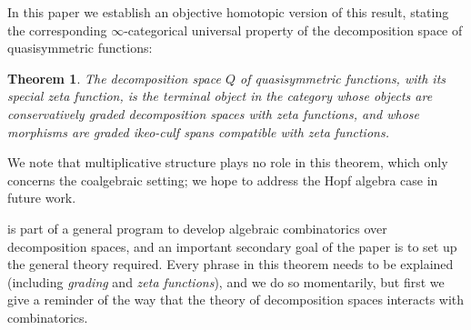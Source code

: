 \documentclass{amsart}
\newtheorem{letterthm}{Theorem}\renewcommand{\theletterthm}{\Alph{letterthm}}
\theoremstyle{definition}
\theoremstyle{noname}
\begin{document}
In this paper we establish an objective homotopic version of this result, 
stating the corresponding $\infty$-categorical  universal property of the decomposition space
of quasi\-symmetric functions:
\begin{letterthm}\label{intro theorem A}
The decomposition space $Q$ of quasisymmetric functions, with its special
zeta function, is the terminal object in the category whose objects are
conservatively graded decomposition spaces with zeta functions, and whose
morphisms are graded ikeo-culf spans compatible with zeta functions.
\end{letterthm}
We note
that multiplicative structure plays no role in this theorem, which only concerns the
coalgebraic setting; we hope to address the Hopf algebra case in future work.

 is part of a general program to develop algebraic combinatorics over
decomposition spaces, and an important secondary goal of the paper is to set up the
general theory required.
Every phrase in this theorem needs to be explained (including \emph{grading} and
\emph{zeta functions}), and we do so momentarily, but first we give a reminder of the
way that the theory of decomposition spaces interacts with combinatorics. 
\end{document}
